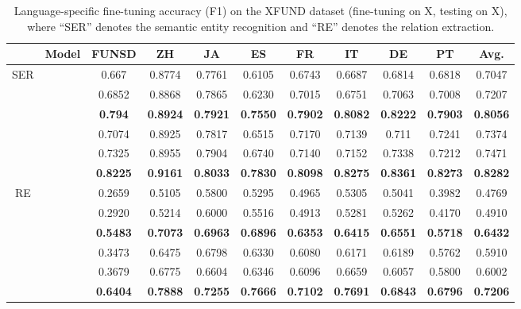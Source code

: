 \documentclass[11pt]{article}
\newcommand{\task}{\textsc{XFUND}\xspace}
\begin{document}
\begin{table*}[ht]
	\small
	\centering
	\begin{tabular}{c|lccccccccc}
		\toprule
& \multicolumn{1}{c}{\bf Model}      & \bf FUNSD & \bf ZH & \bf JA & \bf ES & \bf FR & \bf IT & \bf DE & \bf PT & \bf Avg. \\\midrule
		\multirow{6}{*}{SER} &   & 0.667  & 0.8774 & 0.7761 & 0.6105 & 0.6743 & 0.6687 & 0.6814 & 0.6818 & 0.7047      \\
		                    &       & 0.6852 & 0.8868 & 0.7865 & 0.6230 & 0.7015 & 0.6751 & 0.7063 & 0.7008 & 0.7207      \\
		                    &     & \bf 0.794  & \bf 0.8924 & \bf 0.7921 & \bf 0.7550 & \bf 0.7902 & \bf 0.8082 & \bf 0.8222 & \bf 0.7903 & \bf 0.8056      \\ \cmidrule{2-11}
		                    &  & 0.7074 & 0.8925 & 0.7817 & 0.6515 & 0.7170 & 0.7139 & 0.711  & 0.7241 & 0.7374      \\
		                    &      & 0.7325 & 0.8955 & 0.7904 & 0.6740 & 0.7140 & 0.7152 & 0.7338 & 0.7212 & 0.7471      \\
		                    &    & \bf 0.8225 & \bf 0.9161 & \bf 0.8033 & \bf 0.7830 & \bf 0.8098 & \bf 0.8275 & \bf 0.8361 & \bf 0.8273 & \bf 0.8282      \\\midrule
		\multirow{6}{*}{RE} &   & 0.2659 & 0.5105 & 0.5800 & 0.5295 & 0.4965 & 0.5305 & 0.5041 & 0.3982 & 0.4769 \\
		                    &       & 0.2920 & 0.5214 & 0.6000 & 0.5516 & 0.4913 & 0.5281 & 0.5262 & 0.4170 & 0.4910 \\
		                     &     & \bf 0.5483 & \bf 0.7073 & \bf 0.6963 & \bf 0.6896 & \bf 0.6353 & \bf 0.6415 & \bf 0.6551 & \bf 0.5718 & \bf 0.6432 \\ \cmidrule{2-11}
		                    &  & 0.3473 & 0.6475 & 0.6798 & 0.6330 & 0.6080 & 0.6171 & 0.6189 & 0.5762 & 0.5910 \\
		                    &      & 0.3679 & 0.6775 & 0.6604 & 0.6346 & 0.6096 & 0.6659 & 0.6057 & 0.5800 & 0.6002 \\
		                    &    & \bf 0.6404 & \bf 0.7888 & \bf 0.7255 & \bf 0.7666 & \bf 0.7102 & \bf 0.7691 & \bf 0.6843 & \bf 0.6796 & \bf 0.7206 \\
		\bottomrule
	\end{tabular}
	\caption{Language-specific fine-tuning accuracy (F1) on the \task dataset (fine-tuning on X, testing on X), where ``SER'' denotes the semantic entity recognition and ``RE'' denotes the relation extraction.}
	\label{tab:x2x}
\end{table*}
\end{document}
